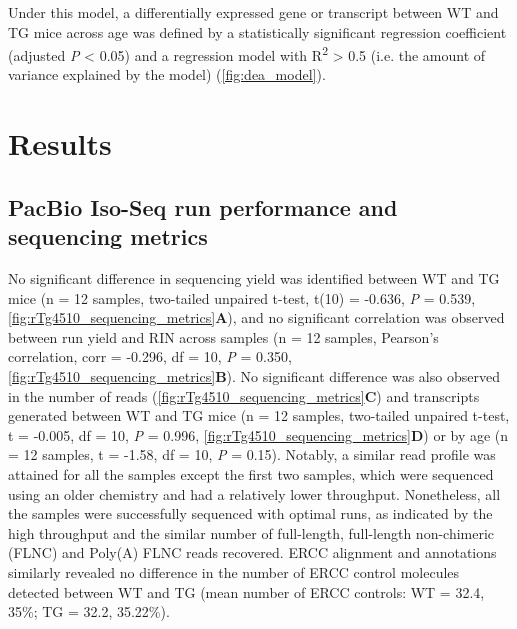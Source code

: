 Under this model, a differentially expressed gene or transcript between WT and TG mice across age was defined by a statistically significant regression coefficient (adjusted \textit{P} < 0.05) and a regression model with R\textsuperscript{2} > 0.5 (i.e. the amount of variance explained by the model) (\cref{fig:dea_model}). 


\clearpage 
\section{Results}
\subsection{PacBio Iso-Seq run performance and sequencing metrics}
No significant difference in sequencing yield was identified between WT and TG mice (n = 12 samples, two-tailed unpaired t-test, t(10) = -0.636, \textit{P} = 0.539, \cref{fig:rTg4510_sequencing_metrics}\textbf{A}), and no significant correlation was observed between run yield and RIN across samples (n = 12 samples, Pearson's correlation, corr = -0.296, df = 10, \textit{P} = 0.350, \cref{fig:rTg4510_sequencing_metrics}\textbf{B}). No significant difference was also observed in the number of reads (\cref{fig:rTg4510_sequencing_metrics}\textbf{C}) and transcripts generated between WT and TG mice (n = 12 samples, two-tailed unpaired t-test, t = -0.005, df = 10, \textit{P} = 0.996, \cref{fig:rTg4510_sequencing_metrics}\textbf{D}) or by age (n = 12 samples, t = -1.58, df = 10, \textit{P} = 0.15). Notably, a similar read profile was attained for all the samples except the first two samples, which were sequenced using an older chemistry and had a relatively lower throughput. Nonetheless, all the samples were successfully sequenced with optimal runs, as indicated by the high throughput and the similar number of full-length, full-length non-chimeric (FLNC) and Poly(A) FLNC reads recovered. ERCC alignment and annotations similarly revealed no difference in the number of ERCC control molecules detected between WT and TG (mean number of ERCC controls: WT = 32.4, 35\%; TG = 32.2, 35.22\%). 

